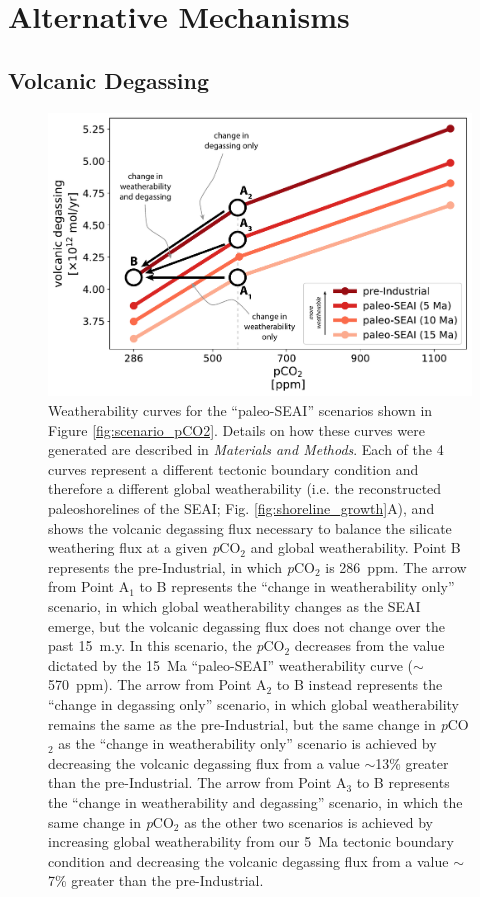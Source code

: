 \documentclass[9pt,twocolumn,twoside,lineno]{pnas-new}
\newcommand{\pCOtwo}{\textit{p}CO$_{2}$\xspace}
\newcommand{\MM}{\textit{Materials and Methods}\xspace}
\begin{document}
\section*{Alternative Mechanisms}

\subsection*{Volcanic Degassing}

\begin{figure}[h]
    \centering
    \includegraphics[width=1\linewidth]{Manuscript/Figures/weatherability_curves.pdf}
    \caption{Weatherability curves for the ``paleo-SEAI'' scenarios shown in Figure \ref{fig:scenario_pCO2}. Details on how these curves were generated are described in \MM. Each of the 4 curves represent a different tectonic boundary condition and therefore a different global weatherability (i.e. the reconstructed paleoshorelines of the SEAI; Fig. \ref{fig:shoreline_growth}A), and shows the volcanic degassing flux necessary to balance the silicate weathering flux at a given \pCOtwo and global weatherability. Point B represents the pre-Industrial, in which \pCOtwo is 286~ppm. The arrow from Point A$_{1}$ to B represents the ``change in weatherability only'' scenario, in which global weatherability changes as the SEAI emerge, but the volcanic degassing flux does not change over the past 15~m.y. In this scenario, the \pCOtwo decreases from the value dictated by the 15~Ma ``paleo-SEAI'' weatherability curve ($\sim$570~ppm). The arrow from Point A$_{2}$ to B instead represents the ``change in degassing only'' scenario, in which global weatherability remains the same as the pre-Industrial, but the same change in \pCOtwo as the ``change in weatherability only'' scenario is achieved by decreasing the volcanic degassing flux from a value $\sim$13\% greater than the pre-Industrial. The arrow from Point A$_{3}$ to B represents the ``change in weatherability and degassing'' scenario, in which the same change in \pCOtwo as the other two scenarios is achieved by increasing global weatherability from our 5~Ma tectonic boundary condition and decreasing the volcanic degassing flux from a value $\sim$7\% greater than the pre-Industrial.}
    \label{fig:weatherability_curves}
\end{figure}
\end{document}
